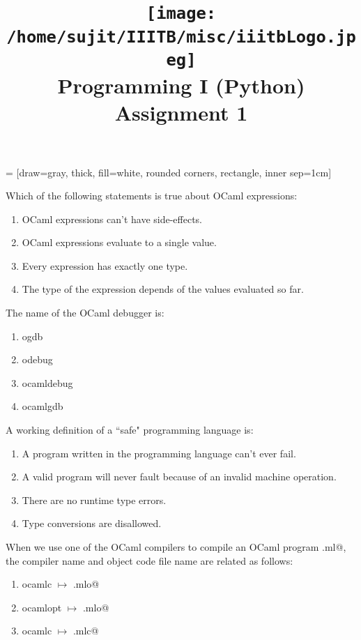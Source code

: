 \documentclass[addpoints,11pt]{exam}
\author{}
\title{\texttt{[image: /home/sujit/IIITB/misc/iiitbLogo.jpeg]} \\ Programming I (Python) \\ Assignment 1}
\date{}
\begin{document}
   = [draw=gray, thick, fill=white, rounded corners, rectangle, inner sep=1cm]
\maketitle


\thispagestyle{head}
\begin{questions}
\question Which of the following statements is true about OCaml expressions:
\begin{enumerate}
\item OCaml expressions can't have side-effects.
\item OCaml expressions evaluate to a single value.
\item Every expression has exactly one type.
\item The type of the expression depends of the values evaluated so far.
\end{enumerate}\question The name of the OCaml debugger is:
\begin{enumerate}
\item ogdb
\item odebug
\item ocamldebug
\item ocamlgdb
\end{enumerate}\question A working definition of a ``safe" programming language is:
\begin{enumerate}
\item A program written in the programming language can't ever fail.
\item A valid program will never fault because of an invalid machine operation.
\item There are no runtime type errors.
\item Type conversions are disallowed.
\end{enumerate}\question When we use one of the OCaml compilers to compile an OCaml program \lstinline@program.ml@, the compiler name and object code file name are related as follows:
\begin{enumerate}
\item ocamlc $\mapsto$ \lstinline@program.mlo@
\item ocamlopt $\mapsto$ \lstinline@program.mlo@
\item ocamlc $\mapsto$ \lstinline@program.mlc@

\end{enumerate}
\end{questions}
\end{document}
